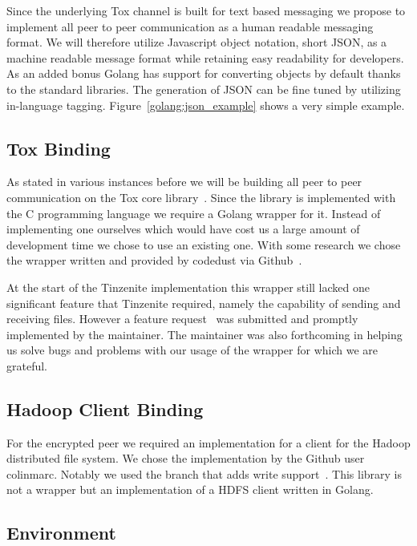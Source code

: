 Since the underlying Tox channel is built for text based messaging we propose to implement all peer to peer communication as a human readable messaging format.
We will therefore utilize Javascript object notation, short JSON, as a machine readable message format while retaining easy readability for developers.
As an added bonus Golang has support for converting objects by default thanks to the standard libraries.
The generation of JSON can be fine tuned by utilizing in-language tagging.
Figure~\ref{golang:json_example} shows a very simple example.

\subsection{Tox Binding}
\label{sub:Tox Binding}

As stated in various instances before we will be building all peer to peer communication on the Tox core library~\cite{web:site:github:toxcore}.
Since the library is implemented with the C programming language we require a Golang wrapper for it.
Instead of implementing one ourselves which would have cost us a large amount of development time we chose to use an existing one.
With some research we chose the wrapper written and provided by codedust via Github~\cite{web:site:github:gotox}.

At the start of the Tinzenite implementation this wrapper still lacked one significant feature that Tinzenite required, namely the capability of sending and receiving files.
However a feature request~\cite{web:site:github:file_issue} was submitted and promptly implemented by the maintainer.
The maintainer was also forthcoming in helping us solve bugs and problems with our usage of the wrapper for which we are grateful.

\subsection{Hadoop Client Binding}
\label{sub:Hadoop Client Binding}

For the encrypted peer we required an implementation for a client for the Hadoop distributed file system.
We chose the implementation by the Github user colinmarc.
Notably we used the branch that adds write support~\cite{web:site:github:hdfs}.
This library is not a wrapper but an implementation of a HDFS client written in Golang.

\subsection{Environment}
\label{sub:Environment}

